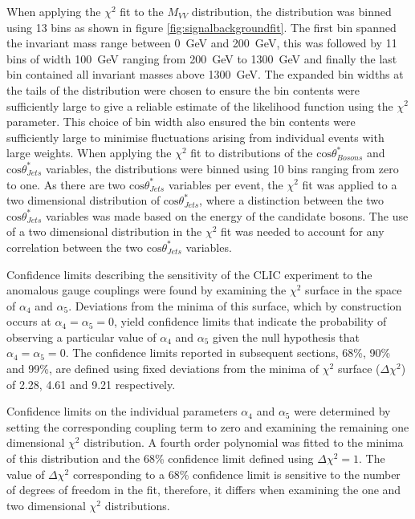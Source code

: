 When applying the $\chi^{2}$ fit to the $M_{VV}$ distribution, the distribution was binned using 13 bins as shown in figure \ref{fig:signalbackgroundfit}.  The first bin spanned the invariant mass range between 0~GeV and 200~GeV, this was followed by 11 bins of width 100~GeV ranging from 200~GeV to 1300~GeV and finally the last bin contained all invariant masses above 1300~GeV.  The expanded bin widths at the tails of the distribution were chosen to ensure the bin contents were sufficiently large to give a reliable estimate of the likelihood function using the $\chi^{2}$ parameter.  This choice of bin width also ensured the bin contents were sufficiently large to minimise fluctuations arising from individual events with large weights.  When applying the $\chi^{2}$ fit to distributions of the $\text{cos}\theta^{*}_{Bosons}$ and $\text{cos}\theta^{*}_{Jets}$ variables, the distributions were binned using 10 bins ranging from zero to one.  As there are two $\text{cos}\theta^{*}_{Jets}$ variables per event, the $\chi^{2}$ fit was applied to a two dimensional distribution of $\text{cos}\theta^{*}_{Jets}$, where a distinction between the two $\text{cos}\theta^{*}_{Jets}$ variables was made based on the energy of the candidate bosons.  The use of a two dimensional distribution in the $\chi^{2}$ fit was needed to account for any correlation between the two $\text{cos}\theta^{*}_{Jets}$ variables.  

Confidence limits describing the sensitivity of the CLIC experiment to the anomalous gauge couplings were found by examining the $\chi^{2}$ surface in the space of $\alpha_{4}$ and $\alpha_{5}$.  Deviations from the minima of this surface, which by construction occurs at $\alpha_{4} = \alpha_{5} = 0$, yield confidence limits that indicate the probability of observing a particular value of $\alpha_{4}$ and $\alpha_{5}$ given the null hypothesis that $\alpha_{4} = \alpha_{5} = 0$.  The confidence limits reported in subsequent sections, 68\%, 90\% and 99\%, are defined using fixed deviations from the minima of $\chi^{2}$ surface ($\Delta\chi^{2}$) of 2.28, 4.61 and 9.21 respectively.

Confidence limits on the individual parameters $\alpha_{4}$ and $\alpha_{5}$ were determined by setting the corresponding coupling term to zero and examining the remaining one dimensional $\chi^{2}$ distribution.  A fourth order polynomial was fitted to the minima of this distribution and the 68\% confidence limit defined using $\Delta\chi^{2} = 1$.  The value of $\Delta\chi^{2}$ corresponding to a 68\% confidence limit is sensitive to the number of degrees of freedom in the fit, therefore, it differs when examining the one and two dimensional $\chi^{2}$ distributions.  

